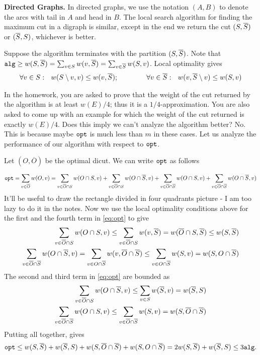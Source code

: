 \documentclass[11pt]{article}
\def\bar{\overline}
\def\opt{{\tt opt}}
\def\alg{{\tt alg}}
\begin{document}
\noindent
{\bf Directed Graphs. }
In directed graphs, we use the notation $(A,B)$ to denote the arcs with tail in $A$ and head in $B$.
The local search algorithm for finding the maximum cut in a digraph is similar, except in the end we return the
cut $(S,\S)$ or $(\S,S)$, whichever is better. 

Suppose the algorithm terminates with the partition $(S,\S)$. 
Note that $\alg \ge w(S,\S) = \sum_{v\in S}w(v,\S) = \sum_{v\in\S}w(S,v)$.
Local optimality gives
\begin{align*}
\forall v\in S: ~~  w(S\setminus v,v)  \le  w(v,\S); ~~~~~~~~~~~~
\forall v\in \S: ~~  w(v,\S\setminus v)  \le w(S,v) 
\end{align*}


\def\O{\bar{O}}
\indent
In the homework, you are asked to prove that the weight of the cut returned by the algorithm is at least $w(E)/4$; thus it is a $1/4$-approximation. You are also asked to come up with an example for which the weight of the cut returned is exactly $w(E)/4$. Does this imply we can't analyze the algorithm better? No.
This is because maybe $\opt$ is much less than $m$ in these cases. Let us analyze the performance of our algorithm with respect to $\opt$.

 Let $(O,\O)$ be the optimal dicut. We can write $\opt$ as follows

\begin{equation}\label{eq:opt}
\opt = \sum_{v\in \O} w(O,v) = \sum_{v\in \O\cap S} w(O\cap S,v)+\sum_{v\in\O\cap S}w(O\cap \S,v) +\sum_{v\in \O\cap \S}w(O\cap S,v) +\sum_{v\in \O\cap \S}w(O\cap \S,v)
\end{equation}
\noindent
It'll be useful to draw the rectangle divided in four quadrants picture - I am too lazy to do it in the notes.
Now we use the local optimality conditions above for the first and the fourth term in \eqref{eq:opt} to give
\begin{align}
\sum_{v\in \O\cap S} w(O\cap S,v) \le \sum_{v\in \O\cap S} w(v, \S) = w(\O\cap S,\S) \le w(S,\S) \label{eq:1} \\
\sum_{v\in \O\cap \S}w(O\cap \S,v) = \sum_{v\in O\cap \S} w(v,\O\cap\S) \le \sum_{v\in O\cap \S} w(S,v) = w(S,O\cap \S)\label{eq:4}
\end{align}
The second and third term in \eqref{eq:opt} are bounded as
\begin{align}
\sum_{v\in\O\cap S}w(O\cap \S,v) \le \sum_{v\in S} w(\S, v) = w(\S,S) \label{eq:2} \\
\sum_{v\in \O\cap \S}w(O\cap S,v)  \le \sum_{v\in \O\cap \S} w(S,v) = w(S,\O\cap \S)\label{eq:3}
\end{align}
Putting all together, gives 
$$\opt \le w(S,\S) + w(\S,S) + w(S, \O\cap \S) + w(S,O\cap \S) = 2w(S,\S) + w(\S,S) \le 3\alg.$$
\end{document}
